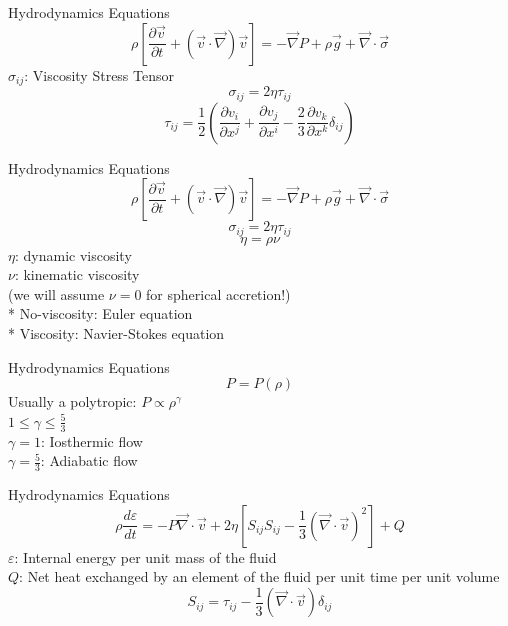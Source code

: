 \documentclass{beamer}
\begin{document}
\begin{darkframes}
\begin{frame}{Hydrodynamics Equations}
	\[ \rho \left[\frac{\partial \vec{v}}{\partial t} + \left( \vec{v} \cdot \vec{\nabla} \right) \vec{v} \right]
	= -\vec{\nabla} P + \rho \vec{g} + \vec{\nabla} \cdot \vec{\sigma}\]
	\pause
	\bigskip
	\justify
	$\sigma_{ij}$: Viscosity Stress Tensor 
	\pause
	\[ \sigma_{ij} = 2\eta \tau_{ij} \]
	\pause
	\[ \tau_{ij} = \frac{1}{2} \left( \frac{\partial v_i}{\partial x^j} + \frac{\partial v_j}{\partial x^i}
	- \frac{2}{3} \frac{\partial v_k}{\partial x^k} \delta_{ij} \right)\]
\end{frame}

\begin{frame}{Hydrodynamics Equations}
	\[ \rho \left[\frac{\partial \vec{v}}{\partial t} + \left( \vec{v} \cdot \vec{\nabla} \right) \vec{v} \right]
	= -\vec{\nabla} P + \rho \vec{g} + \vec{\nabla} \cdot \vec{\sigma}\]
	\pause
	\bigskip
	\justify
	\[ \sigma_{ij} = 2\eta \tau_{ij} \]
	\pause
	\[ \eta = \rho \nu\]
	\pause
	$\eta$: dynamic viscosity\\
	$\nu$: kinematic viscosity\\
	
	\pause
	(we will assume $\nu = 0 $ for spherical accretion!)\\
	\pause
	\tiny
	* No-viscosity: Euler equation\\
	* Viscosity: Navier-Stokes equation
\end{frame}

\begin{frame}{Hydrodynamics Equations}
	\[ P = P(\rho) \]
	\pause
	\bigskip
	\justify
	Usually a polytropic: $P \propto \rho^\gamma $\\
	\pause
	\bigskip
	$1\leq \gamma \leq \frac{5}{3}$\\
	
	$\gamma = 1$: Iosthermic flow\\
	
	$\gamma = \frac{5}{3}$: Adiabatic flow
\end{frame}

\begin{frame}{Hydrodynamics Equations}
	\[ \rho \frac{d \varepsilon}{dt} = -P \vec{\nabla}\cdot \vec{v} 
	+ 2\eta \left[ S_{ij} S_{ij} - \frac{1}{3} (\vec{\nabla}\cdot \vec{v})^2 \right] + Q \]
	\pause
	\bigskip
	\justify
	$\varepsilon$: Internal energy per unit mass of the fluid\\
	\pause
	$Q$: Net heat exchanged by an element of the fluid per unit time per unit volume\\
	\pause
	\[S_{ij} = \tau_{ij} - \frac{1}{3} (\vec{\nabla}\cdot \vec{v})\delta_{ij} \]
\end{frame}


\end{darkframes}
\end{document}
